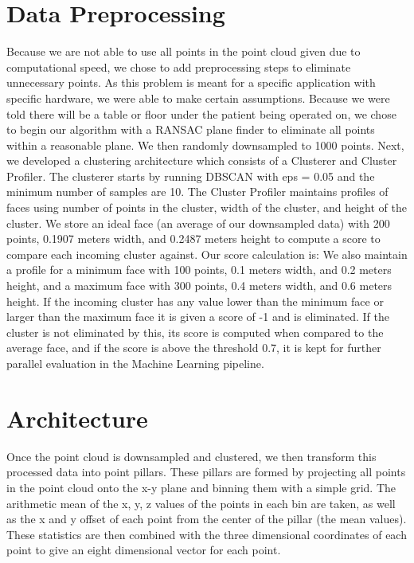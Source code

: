 \documentclass{article}
\begin{document}
\section{Data Preprocessing} Because we are not able to use all points in the point cloud given due to computational speed, we chose to add preprocessing steps to eliminate unnecessary points. As this problem is meant for a specific application with specific hardware, we were able to make certain assumptions. Because we were told there will be a table or floor under the patient being operated on, we chose to begin our algorithm with a RANSAC plane finder to eliminate all points within a reasonable plane. We then randomly downsampled to 1000 points. Next, we developed a clustering architecture which consists of a Clusterer and Cluster Profiler. The clusterer starts by running DBSCAN with eps = 0.05 and the minimum number of samples are 10. The Cluster Profiler maintains profiles of faces using number of points in the cluster, width of the cluster, and height of the cluster. We store an ideal face (an average of our downsampled data) with 200 points, 0.1907 meters width, and 0.2487 meters height to compute a score to compare each incoming cluster against. Our score calculation is: We also maintain a profile for a minimum face with 100 points, 0.1 meters width, and 0.2 meters height, and a maximum face with 300 points, 0.4 meters width, and 0.6 meters height. If the incoming cluster has any value lower than the minimum face or larger than the maximum face it is given a score of -1 and is eliminated. If the cluster is not eliminated by this, its score is computed when compared to the average face, and if the score is above the threshold 0.7, it is kept for further parallel evaluation in the Machine Learning pipeline. 

\section{Architecture} 

Once the point cloud is downsampled and clustered, we then transform this processed data into point pillars. These pillars are formed by projecting all points in the point cloud onto the x-y plane and binning them with a simple grid. The arithmetic mean of the x, y, z values of the points in each bin are taken, as well as the x and y offset of each point from the center of the pillar (the mean values). These statistics are then combined with the three dimensional coordinates of each point to give an eight dimensional vector for each point. 
\end{document}
